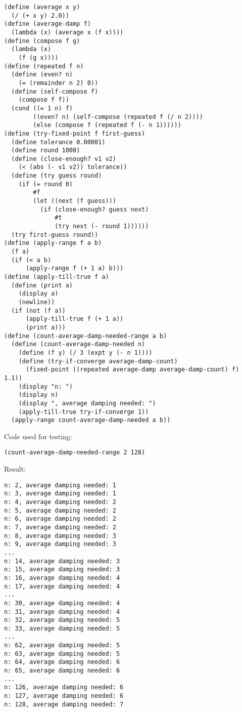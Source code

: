 \documentclass[../main.tex]{subfiles}
\begin{document}
\begin{lstlisting}
(define (average x y)
  (/ (+ x y) 2.0))
(define (average-damp f)
  (lambda (x) (average x (f x))))
(define (compose f g)
  (lambda (x)
    (f (g x))))
(define (repeated f n)
  (define (even? n)
    (= (remainder n 2) 0))
  (define (self-compose f)
    (compose f f))
  (cond ((= 1 n) f)
        ((even? n) (self-compose (repeated f (/ n 2))))
        (else (compose f (repeated f (- n 1))))))
(define (try-fixed-point f first-guess)
  (define tolerance 0.00001)
  (define round 1000)
  (define (close-enough? v1 v2)
    (< (abs (- v1 v2)) tolerance))
  (define (try guess round)
    (if (= round 0)
        #f
        (let ((next (f guess)))
          (if (close-enough? guess next)
              #t
              (try next (- round 1))))))
  (try first-guess round))
(define (apply-range f a b)
  (f a)
  (if (< a b)
      (apply-range f (+ 1 a) b)))
(define (apply-till-true f a)
  (define (print a)
    (display a)
    (newline))
  (if (not (f a))
      (apply-till-true f (+ 1 a))
      (print a)))
(define (count-average-damp-needed-range a b)
  (define (count-average-damp-needed n)
    (define (f y) (/ 3 (expt y (- n 1))))
    (define (try-if-converge average-damp-count)
      (fixed-point ((repeated average-damp average-damp-count) f) 1.1))
    (display "n: ")
    (display n)
    (display ", average damping needed: ")
    (apply-till-true try-if-converge 1))
  (apply-range count-average-damp-needed a b))
\end{lstlisting}

Code used for testing:

\begin{lstlisting}
(count-average-damp-needed-range 2 128)
\end{lstlisting}

Result:

\begin{lstlisting}
n: 2, average damping needed: 1
n: 3, average damping needed: 1
n: 4, average damping needed: 2
n: 5, average damping needed: 2
n: 6, average damping needed: 2
n: 7, average damping needed: 2
n: 8, average damping needed: 3
n: 9, average damping needed: 3
...
n: 14, average damping needed: 3
n: 15, average damping needed: 3
n: 16, average damping needed: 4
n: 17, average damping needed: 4
...
n: 30, average damping needed: 4
n: 31, average damping needed: 4
n: 32, average damping needed: 5
n: 33, average damping needed: 5
...
n: 62, average damping needed: 5
n: 63, average damping needed: 5
n: 64, average damping needed: 6
n: 65, average damping needed: 6
...
n: 126, average damping needed: 6
n: 127, average damping needed: 6
n: 128, average damping needed: 7
\end{lstlisting}
\end{document}
